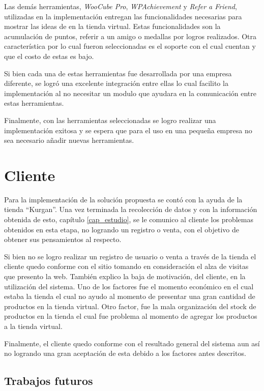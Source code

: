 Las demás herramientas, \emph{WooCube Pro}, \emph{WPAchievement} y \emph{Refer a Friend}, utilizadas en la 
implementación entregan las funcionalidades necesarias para mostrar las ideas de {\gam} en la tienda virtual. Estas funcionalidades son la acumulación de puntos, referir a un amigo o medallas por logros realizados. Otra característica por
lo cual fueron seleccionadas es el soporte con el cual cuentan y que el costo de estas es bajo.

Si bien cada una de estas herramientas fue desarrollada por una empresa diferente, se logró una excelente
integración entre ellas lo cual facilito la implementación al no necesitar un modulo que ayudara en la comunicación
entre estas herramientas.

Finalmente, con las herramientas seleccionadas se logro realizar una implementación exitosa y se espera que para
el uso en una pequeña empresa no sea necesario añadir nuevas herramientas.

\section{Cliente}

Para la implementación de la solución propuesta se contó con la ayuda de la tienda ``Kurgan''. Una vez terminada
la recolección de datos y con la información obtenida de esto, capítulo \ref{cap_estudio}, se le comunico
al cliente los problemas obtenidos en esta etapa, no logrando un registro o venta, con el objetivo de obtener
sus pensamientos al respecto.

Si bien no se logro realizar un registro de usuario o venta a través de la tienda el cliente quedo conforme con
el sitio tomando en consideración el alza de visitas que presento la web. También explico la baja de motivación,
del cliente, en la utilización del sistema. Uno de los factores fue el momento económico en el cual estaba la tienda
el cual no ayudo al momento de presentar una gran cantidad de productos en la tienda virtual. Otro factor, fue la
mala organización del stock de productos en la tienda el cual fue problema al momento de agregar los productos
a la tienda virtual.

Finalmente, el cliente quedo conforme con el resultado general del sistema aun así no logrando una gran aceptación 
de esta debido a los factores antes descritos.

\subsection{Trabajos futuros}

